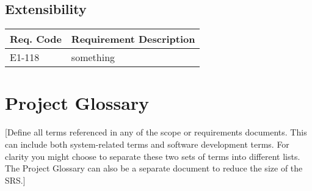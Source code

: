 \documentclass[12pt]{article}
\begin{document}
\subsection{Extensibility}

\begin{table}[!h]
	\begin{tabular}{| l | l |}
		\hline
		\textbf{Req. Code} & \textbf{Requirement Description}\\
		\hline
		E1-118	& something\\
		\hline
	\end{tabular}
	\label{tab:ExtensibilityRequirements}
\end{table}


\section{Project Glossary}
[Define all terms referenced in any of the scope or requirements documents. This can include both system-related terms and software 
development terms. For clarity you might choose to separate these two sets of terms into different lists. The Project Glossary can 
also be a separate document to reduce the size of the SRS.]
\end{document}
